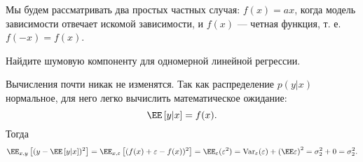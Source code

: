 \documentclass[12pt,fleqn]{article}
\begin{document}
Мы будем рассматривать два простых частных случая: $f(x) = ax$, когда модель зависимости отвечает искомой зависимости, и $f(x)$ --- четная функция, т. е. $f(-x) = f(x)$.  
\newpage
\begin{vkProblem}
Найдите шумовую компоненту для одномерной линейной регрессии.
\end{vkProblem}
\begin{esSolution}
    Вычисления почти никак не изменятся.
    Так как распределение $p(y|x)$ нормальное, для него легко вычислить математическое ожидание:
    $$
    \EE\left[y|x\right] = f(x).
    $$
    Тогда
    $$
    \EE_{x, y}\left[(y - \EE\left[y|x\right] )^2\right] = 
    \EE_{x, \varepsilon}\left[(f(x) + \varepsilon - f(x) )^2\right] = 
    \EE_{\varepsilon} (\varepsilon^2) = \text{Var}_{\varepsilon}(\varepsilon) + \left(\EE\varepsilon\right)^2 = \sigma_2^2 + 0 = \sigma_2^2.
    $$
\end{esSolution}
\end{document}
